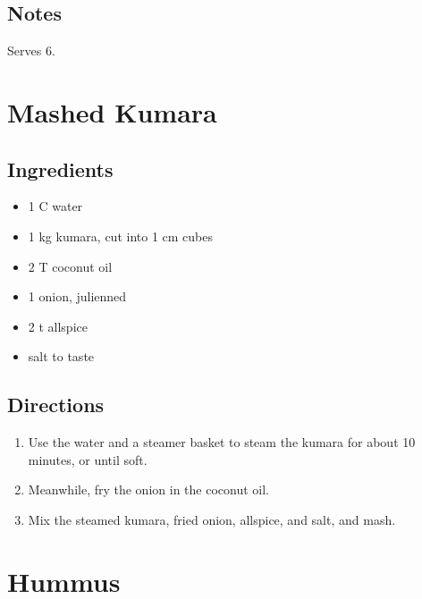 \documentclass[letterpaper,10pt,english]{sphinxmanual}
\begin{document}
\section{Notes}
\label{red_cabbage_salad:notes}
Serves 6.


\chapter{Mashed Kumara}
\label{mashed_kumara::doc}\label{mashed_kumara:mashed-kumara}

\section{Ingredients}
\label{mashed_kumara:ingredients}\begin{itemize}
\item {} 
1    C      water

\item {} 
1       kg      kumara, cut into 1 cm cubes

\item {} 
2       T       coconut oil

\item {} 
1       onion, julienned

\item {} 
2   t       allspice

\item {} 
salt to taste

\end{itemize}


\section{Directions}
\label{mashed_kumara:directions}\begin{enumerate}
\item {} 
Use the water and a steamer basket to steam the kumara for about 10 minutes, or until soft.

\item {} 
Meanwhile, fry the onion in the coconut oil.

\item {} 
Mix the steamed kumara, fried onion, allspice, and salt, and mash.

\end{enumerate}


\chapter{Hummus}
\label{hummus:hummus}\label{hummus::doc}
\end{document}

